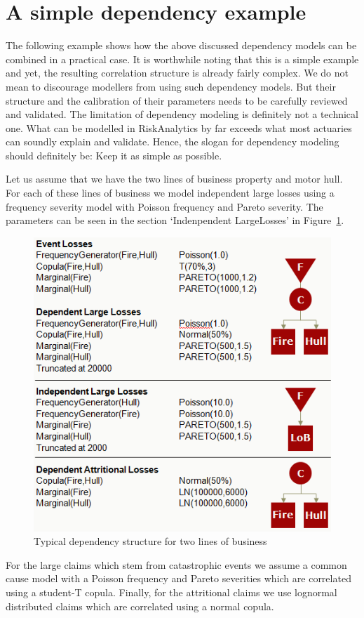 \section{A simple dependency example}
\label{sec:depExample}
The following example shows how the above discussed dependency models can be combined in a practical case. It is worthwhile noting that this is a simple example and yet, the resulting correlation structure is already fairly complex. We do not mean to discourage modellers from using such dependency models. But their structure and the calibration of their parameters needs to be carefully reviewed and validated. The limitation of dependency modeling is definitely not a technical one. What can be modelled in RiskAnalytics by far exceeds what most actuaries can soundly explain and validate. Hence, the slogan for dependency modeling should definitely be: Keep it as simple as possible.

Let us assume that we have the two lines of business property and motor hull. For each of these lines of business we model independent large losses using a frequency severity model with Poisson frequency and Pareto severity. The parameters can be seen in the section `Indenpendent LargeLosses' in Figure~\ref{fig:simpleDependencyExample}. 
\begin{figure}
		\centering
		\includegraphics[scale=0.75]{images/twoLoBDependencyExample.png}		
	\caption{Typical dependency structure for two lines of business}
	\label{fig:simpleDependencyExample}
\end{figure}
For the large claims which stem from catastrophic events we assume a common cause model with a Poisson frequency and Pareto severities which are correlated using a student-T copula. Finally, for the attritional claims we use lognormal distributed claims which are correlated using a normal copula. 


